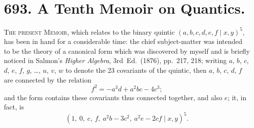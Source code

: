 \documentclass[12pt,a4paper]{article}
\begin{document}
\section*{693. A Tenth Memoir on Quantics.}
\label{paper:693}


\bigskip

\textsc{The present Memoir}, which relates to the binary quintic $(a, b, c, d, e, f \mid x, y)^5$, has been in hand for a considerable time: the chief subject-matter was intended to be the theory of a canonical form which was discovered by myself and is briefly noticed in Salmon's \textit{Higher Algebra}, 3rd~Ed.\ (1876), pp.~217, 218; writing $a$, $b$, $c$, $d$, $e$, $f$, $g$, \ldots, $u$, $v$, $w$ to denote the 23 covariants of the quintic, then $a$, $b$, $c$, $d$, $f$ are connected by the relation
\[
f^2 = -a^3 d + a^2 bc - 4c^3;
\]
and the form contains these covariants thus connected together, and also $e$; it, in fact, is
\[
(1,\ 0,\ c,\ f,\ a^2 b - 3c^2,\ a^2 e - 2cf \mid x, y)^5.
\]
\end{document}
